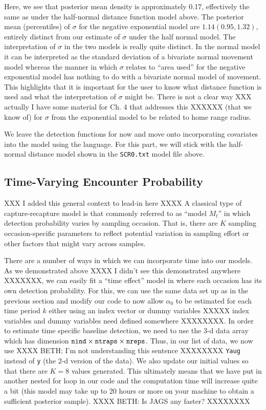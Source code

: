 Here, we see that posterior mean density is approximately 0.17,
effectively the same as under the half-normal distance function model
above.  The posterior mean (percentiles) of $\sigma$ for the negative
exponential model are $1.14 (0.95, 1.32)$, entirely distinct from our
estimate of $\sigma$ under the half normal model. The interpretation
of $\sigma$ in the two models is really quite distinct. In the normal
model it can be interpreted as the standard deviation of a bivariate
normal movement model whereas the manner in which $\sigma$ relates to
``area used'' for the negative exponential model has nothing to do
with a bivariate normal model of movement.  This highlights that it is
important for the user to know what distance function is used and what
the interpretation of $\sigma$ might be.  There is not a clear way XXX
actually I have some material for Ch. 4 that addresses this XXXXXX
(that we know of) for $\sigma$ from the exponential model to be
related to home range radius.

We leave the detection functions for now and move onto incorporating
covariates into the model using the \bugs 
language.  For this part, we will stick with the half-normal distance
model shown in the \mbox{\tt SCR0.txt} model file above. 

\subsection{Time-Varying Encounter Probability}

XXX I added this general context to lead-in here XXXX
A classical type of capture-recapture model is that commonly referred
to as ``model $M_{t}$'' \citep{otis_etal:1978} in which detection probability varies by
sampling occasion. That is, there are $K$ sampling occasion-specific
parameters to reflect potential variation in sampling effort or other
factors that might vary across samples.

There are a number of ways in which we can incorporate time into our
models.  As we demonstrated above XXXX I didn't see this demonstrated
anywhere XXXXXXX, we can easily fit a ``time effect'' model in \winbugs
where each occasion has its own detection probability.
For this, we can use the same data set up as in the previous
section and modify our \winbugs code to now allow $\alpha_0$ to be
estimated for each time period $k$ either using an index vector or
dummy variables XXXXX index variables and dummy variables need defined
somewhere XXXXXXXX.  In order to estimate time
specific baseline detection, we need to use the 3-d data array which
has dimension
$\mbox{\tt nind} \times \mbox{\tt ntraps} \times \mbox{\tt nreps}$.
Thus, in our list of data, we now use 
XXXX BETH: I'm not understanding this sentence XXXXXXXX
\mbox{\tt Yaug}
instead of \mbox{\tt y} (the 2-d version of the data).  We also update our
initial values so that there are $K=8$ values generated. This
ultimately means that we have put in another nested for loop in our
code and the computation time will increase quite a bit (this model
may take up to 20 hours or more on your machine to obtain a sufficient
posterior sample). XXXX BETH: Is JAGS any faster? XXXXXXXX

